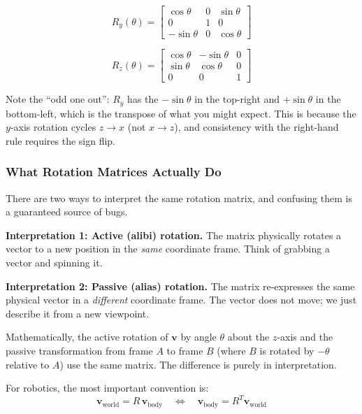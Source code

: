 \begin{equation}
R_y(\theta) = \begin{bmatrix} \cos\theta & 0 & \sin\theta \\ 0 & 1 & 0 \\ -\sin\theta & 0 & \cos\theta \end{bmatrix}
\end{equation}

\begin{equation}
R_z(\theta) = \begin{bmatrix} \cos\theta & -\sin\theta & 0 \\ \sin\theta & \cos\theta & 0 \\ 0 & 0 & 1 \end{bmatrix}
\end{equation}

Note the ``odd one out'': $R_y$ has the $-\sin\theta$ in the top-right and $+\sin\theta$ in the bottom-left, which is the transpose of what you might expect. This is because the $y$-axis rotation cycles $z \to x$ (not $x \to z$), and consistency with the right-hand rule requires the sign flip.

\subsubsection{What Rotation Matrices Actually Do}

There are two ways to interpret the same rotation matrix, and confusing them is a guaranteed source of bugs.

\textbf{Interpretation 1: Active (alibi) rotation.} The matrix physically rotates a vector to a new position in the \textit{same} coordinate frame. Think of grabbing a vector and spinning it.

\textbf{Interpretation 2: Passive (alias) rotation.} The matrix re-expresses the same physical vector in a \textit{different} coordinate frame. The vector does not move; we just describe it from a new viewpoint.

Mathematically, the active rotation of $\mathbf{v}$ by angle $\theta$ about the $z$-axis and the passive transformation from frame $A$ to frame $B$ (where $B$ is rotated by $-\theta$ relative to $A$) use the same matrix. The difference is purely in interpretation.

For robotics, the most important convention is:
\begin{equation}
\mathbf{v}_{\text{world}} = R \, \mathbf{v}_{\text{body}}
\quad \Longleftrightarrow \quad
\mathbf{v}_{\text{body}} = R^T \mathbf{v}_{\text{world}}
\end{equation}


